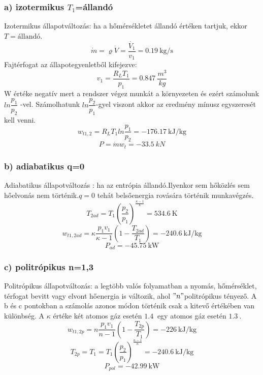 \subsubsection{a) izotermikus $T_1$=állandó}
Izotermikus állapotváltozás: ha a hőmérsékletet állandó értéken tartjuk, ekkor $T=\textrm{állandó}$.
\begin{equation}
\dot{m}=\varrho \dot{V}=\frac{\dot{V_1}}{v_1}=\SI{0,19}{\kilogram\per\second}
\end{equation}
Fajtérfogat az állapotegyenletből kifejezve:
\begin{equation}
v_1=\frac{R_L T_1}{p_1}=\SI{0,847}{\frac{m^3}{kg}}
\end{equation}
W értéke negatív mert a rendszer végez munkát a környezeten és ezért számolunk $ln\dfrac{p_1}{p_2}$ -vel. Számolhatunk $ln\dfrac{p_2}{p_1}$-gyel viszont akkor az eredmény mínusz egyszeresét kell venni.
\begin{equation}
w_{t1,2}=R_LT_1ln\frac{p_1}{p_2}=\SI{-176,17}{\kilo\joule\per\kilogram}
\end{equation}
\begin{equation}
P=\dot{m}w_t=\SI{-33,5}{kN}
\end{equation}

\subsubsection{b) adiabatikus q=0}
Adiabatikus állapotváltozás : ha az entrópia állandó.Ilyenkor sem hőközlés sem hőelvonás nem történik.$q=0$ tehát belsőenergia rovására történik munkavégzés.
\begin{equation}
T_{2ad}=T_1\left(\frac{p_2}{p_1}\right)^\frac{\kappa-1}{\kappa}=\SI{534,6}{\kelvin}
\end{equation}
\begin{equation}
w_{t1,2ad}=\kappa\frac{p_1v_1}{\kappa-1}\left(1-\frac{T_{2ad}}{T_1}\right)=\SI{-240,6}{\kilo\joule\per\kilogram}
\end{equation}
\begin{equation}
P_{ad}=\SI{-45,75}{\kilo\watt}
\end{equation}

\subsubsection{c) politrópikus n=1,3}
Politrópikus állapotváltozás: a legtöbb valós folyamatban a nyomás, hőmérséklet, térfogat bevitt vagy elvont hőenergia is változik, ahol $"n"$politrópikus tényező. A b és c pontokban a számolás azonos módon történik csak a kitevő értékében van különbség.
A $\kappa$ értéke két atomos gáz esetén $\SI{1,4}{}$ egy atomos gáz esetén $\SI{1,3}{}$.
\begin{equation}
w_{t1,2p}=n\frac{p_1v_1}{n-1}\left(1-\frac{T_{2p}}{T_1}\right)=\SI{-226}{\kilo\joule\per\kilogram}
\end{equation}
\begin{equation}
T_{2p}=T_1=T_1\left(\frac{p_2}{p_1}\right)^\frac{n-1}{n}=\SI{-240,6}{\kilo\joule\per\kilogram}
\end{equation}
\begin{equation}
P_{pol}=\SI{-42,99}{\kilo\watt}
\end{equation}


